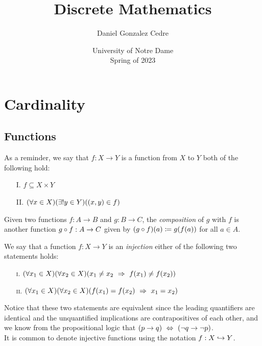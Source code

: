 





\title{Discrete Mathematics}
\author{Daniel Gonzalez Cedre}
\date{University of Notre Dame \\ Spring of 2023}
\maketitle

\setcounter{chapter}{5}
\chapter{Cardinality}

\section{Functions}

\begin{definition}[Function]
    As a reminder,
    we say that $f: X \to Y$ is a function from $X$ to $Y$ \ifandonlyif both of the following hold:
    \begin{enumerate}
        \item[I.]
            $f \subseteq X \times Y$
        \item[II.]
            $\pn*{\forall x \in X}\pn*{\exists ! y \in Y}\pn*{(x, y) \in f}$
    \end{enumerate}
\end{definition}

\begin{definition}[Composition]
    Given two functions $f: A \to B$ and $g: B \to C$,
    the \emph{composition} of $g$ with $f$ is another function $g \circ f: A \to C$
    given by $(g \compose f)(a) \defn g\pn*{f\pn*{a}}$ for all $a \in A$.
\end{definition}

\begin{definition}[Injectivity]
    We say that a function $f: X \to Y$ is an \emph{injection}
    \iffbydefn either of the following two statements holds:
    \begin{enumerate}
        \item[\textsc{i.}]
            $\pn*{\forall x_1 \in X}\pn*{\forall x_2 \in X}\pn*{x_1 \neq x_2 \implies f(x_1) \neq f(x_2)}$
        \item[\textsc{ii.}]
            $\pn*{\forall x_1 \in X}\pn*{\forall x_2 \in X}\pn*{f(x_1) = f(x_2) \implies x_1 = x_2}$
    \end{enumerate}
    Notice that these two statements are equivalent
    since the leading quantifiers are identical
    and the unquantified implications are contrapositives of each other,
    and we know from the propositional logic that $\pn*{p \rightarrow q} \iff \pn*{\neg q \rightarrow \neg p}$.\\
    It is common to denote injective functions using the notation $f: X \hookrightarrow Y$.
\end{definition}

